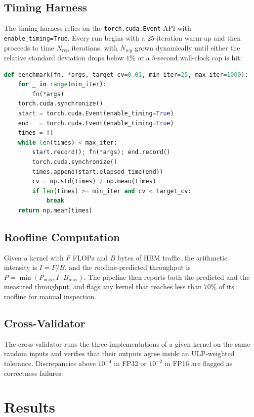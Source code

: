 \subsection{Timing Harness}\label{sec:triton_harness}
The timing harness relies on the \texttt{torch.cuda.Event} API
with \texttt{enable\_timing=True}. Every run begins with a
$25$-iteration warm-up and then proceeds to time
$N_{\text{rep}}$ iterations, with $N_{\text{rep}}$ grown
dynamically until either the relative standard deviation drops
below $1\%$ or a $5$-second wall-clock cap is hit:
\begin{lstlisting}[language=Python,basicstyle=\ttfamily\scriptsize]
def benchmark(fn, *args, target_cv=0.01, min_iter=25, max_iter=1000):
    for _ in range(min_iter):
        fn(*args)
    torch.cuda.synchronize()
    start = torch.cuda.Event(enable_timing=True)
    end   = torch.cuda.Event(enable_timing=True)
    times = []
    while len(times) < max_iter:
        start.record(); fn(*args); end.record()
        torch.cuda.synchronize()
        times.append(start.elapsed_time(end))
        cv = np.std(times) / np.mean(times)
        if len(times) >= min_iter and cv < target_cv:
            break
    return np.mean(times)
\end{lstlisting}

\subsection{Roofline Computation}\label{sec:triton_roofline}
Given a kernel with $F$ FLOPs and $B$ bytes of HBM traffic, the
arithmetic intensity is $I = F/B$, and the roofline-predicted
throughput is $P = \min(P_{\max}, I \cdot B_{\max})$. The pipeline
then reports both the predicted and the measured throughput, and
flags any kernel that reaches less than $70\%$ of its roofline
for manual inspection.

\subsection{Cross-Validator}\label{sec:triton_xval}
The cross-validator runs the three implementations of a given
kernel on the same random inputs and verifies that their outputs
agree inside an ULP-weighted tolerance. Discrepancies above
$10^{-4}$ in FP32 or $10^{-2}$ in FP16 are flagged as correctness
failures.

\section{Results}\label{sec:triton_results}

